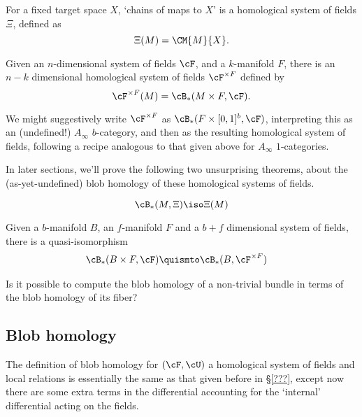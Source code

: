 \begin{thm}
For a fixed target space $X$, `chains of maps to $X$' is a homological system of fields $\Xi$, defined as
\begin{equation*}
\Xi(M) = \CM{M}{X}.
\end{equation*}
\end{thm}

\begin{thm}
Given an $n$-dimensional system of fields $\cF$, and a $k$-manifold $F$, there is an $n-k$ dimensional homological system of fields $\cF^{\times F}$ defined by
\begin{equation*}
\cF^{\times F}(M) = \cB_*(M \times F, \cF).
\end{equation*}
\end{thm}
We might suggestively write $\cF^{\times F}$ as  $\cB_*(F \times [0,1]^b, \cF)$, interpreting this as an (undefined!) $A_\infty$ $b$-category, and then as the resulting homological system of fields, following a recipe analogous to that given above for $A_\infty$ $1$-categories.


In later sections, we'll prove the following two unsurprising theorems, about the (as-yet-undefined) blob homology of these homological systems of fields.


\begin{thm}
\begin{equation*}
\cB_*(M, \Xi) \iso \Xi(M)
\end{equation*}
\end{thm}

\begin{thm}
Given a $b$-manifold $B$, an $f$-manifold $F$ and a $b+f$ dimensional system of fields,
there is a quasi-isomorphism
\begin{align*}
\cB_*(B \times F, \cF) & \quismto \cB_*(B, \cF^{\times F})
\end{align*}
\end{thm}

\begin{question}
Is it possible to compute the blob homology of a non-trivial bundle in terms of the blob homology of its fiber?
\end{question}

\subsection{Blob homology}
The definition of blob homology for $(\cF, \cU)$ a homological system of fields and local relations is essentially the same as that given before in \S \ref{???}, except now there are some extra terms in the differential accounting for the `internal' differential acting on the fields.

